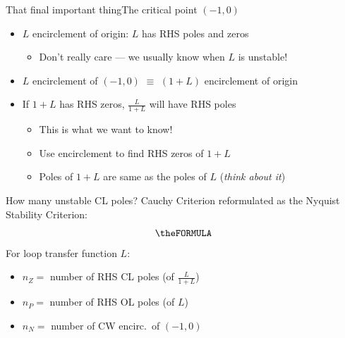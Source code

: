 \documentclass[10pt]{beamer-control}
\begin{document}
\begin{frame}{That final important thing}{The critical point $(-1,0)$}
  \begin{itemize}
    \item  $L$ encirclement of origin: $L$ has RHS poles and zeros
    \begin{itemize}
      \item  Don't really care --- we usually know when $L$ is unstable!
    \end{itemize}
    \bigskip
    \item  $L$ encirclement of $(-1,0)$ $\equiv$ $(1+L)$ encirclement of origin
    \bigskip
    \item  If $1+L$ has RHS zeros, $\frac{L}{1+L}$ will have RHS poles
    \begin{itemize}
    \item  This is what we want to know!
    \item  Use encirclement to find RHS zeros of $1+L$
    \item  Poles of $1+L$ are same as the poles of $L$ (\emph{think about it})
    \end{itemize}
  \end{itemize}
\end{frame}

\begin{frame}{How many unstable CL poles?}
Cauchy Criterion reformulated as the Nyquist Stability Criterion:
\begin{equation}
	\theFORMULA
\end{equation}
For loop transfer function $L$:
\begin{itemize}
\item $n_Z=$ number of RHS CL poles (of $\frac{L}{1+L}$) \hfill {}\smallskip

\item $n_P=$ number of RHS OL poles (of $L$) \hfill {}\smallskip

\item $n_N=$ number of CW encirc.\ of $(-1,0)$ \hfill {}
\end{itemize}

\end{frame}
\end{document}
